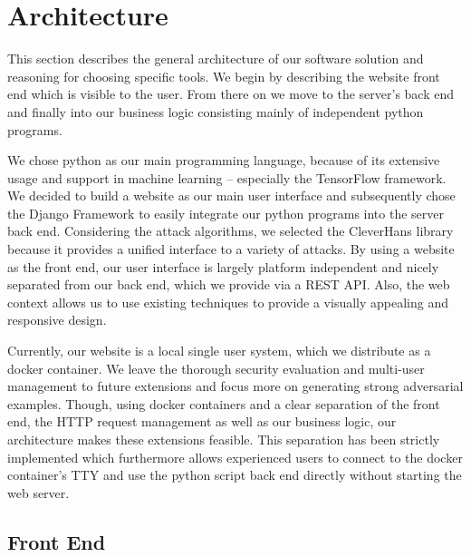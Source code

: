
\section{Architecture}\label{sec:arch}

This section describes the general architecture of our software solution and reasoning for choosing specific tools.
We begin by describing the website front end which is visible to the user.
From there on we move to the server's back end and finally into our business logic consisting mainly of independent python programs.

We chose python as our main programming language, because of its extensive usage and support in machine learning -- especially the TensorFlow framework.
We decided to build a website as our main user interface and subsequently chose the Django Framework to easily integrate our python programs into the server back end.
Considering the attack algorithms, we selected the CleverHans library because it provides a unified interface to a variety of attacks.
By using a website as the front end, our user interface is largely platform independent and nicely separated from our back end, which we provide via a REST API.
Also, the web context allows us to use existing techniques to provide a visually appealing and responsive design.

Currently, our website is a local single user system, which we distribute as a docker container.	
We leave the thorough security evaluation and multi-user management to future extensions and focus more on generating strong adversarial examples.
Though, using docker containers and a clear separation of the front end, the HTTP request management as well as our business logic, our architecture makes these extensions feasible.
This separation has been strictly implemented which furthermore allows experienced users to connect to the docker container's TTY and use the python script back end directly without starting the web server.

%
\subsection{Front End}\label{subsec:frontend}


